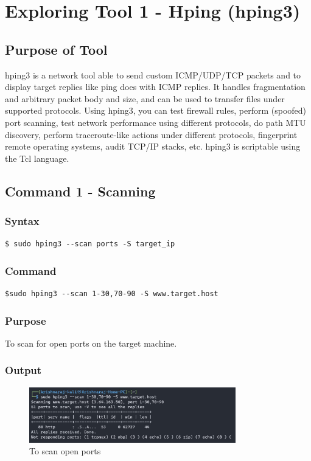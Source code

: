 \documentclass[11pt]{article}
\begin{document}
\tableofcontents
\thispagestyle{empty}
\clearpage

\setcounter{page}{1}

\section{Exploring Tool 1 - Hping (hping3)}

\subsection{Purpose of Tool}
hping3 is a network tool able to send custom ICMP/UDP/TCP packets and to display target replies like ping does with ICMP replies. It handles fragmentation and arbitrary packet body and size, and can be used to transfer files under supported protocols. Using hping3, you can test firewall rules, perform (spoofed) port scanning, test network performance using different protocols, do path MTU discovery, perform traceroute-like actions under different protocols, fingerprint remote operating systems, audit TCP/IP stacks, etc. hping3 is scriptable using the Tcl language.

\subsection{Command 1 - Scanning}

\subsubsection*{Syntax}
\begin{verbatim}
$ sudo hping3 --scan ports -S target_ip
\end{verbatim}

\subsubsection*{Command}
\begin{verbatim}
$sudo hping3 --scan 1-30,70-90 -S www.target.host
\end{verbatim}

\subsubsection*{Purpose}
To scan for open ports on the target machine.

\subsubsection*{Output}
\begin{figure}[H]
    \centering
    \includegraphics[width=0.8\textwidth]{hping scan.jpg}
    \caption{To scan open ports}
    \label{fig:1}
\end{figure}
\end{document}
